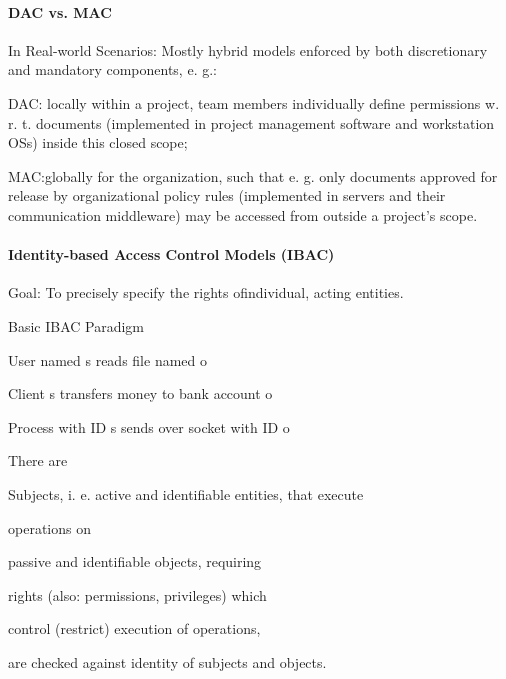 \documentclass[a4paper]{article}
\begin{document}
\begin{multicols}{3}
    \paragraph{DAC vs. MAC}
    In Real-world Scenarios: Mostly hybrid models enforced by both discretionary and mandatory components, e. g.:
    \begin{itemize*}
        \item DAC: locally within a project, team members individually define permissions w. r. t. documents (implemented in project management software and workstation OSs) inside this closed scope;
        \item MAC:globally for the organization, such that e. g. only documents approved for release by organizational policy rules (implemented in servers and their communication middleware) may be accessed from outside a project’s scope.
    \end{itemize*}


    \paragraph{Identity-based Access Control Models (IBAC)}
    Goal: To precisely specify the rights ofindividual, acting entities.

    Basic IBAC Paradigm %
    \begin{itemize*}
        \item User named s reads file named o
        \item Client s transfers money to bank account o
        \item Process with ID s sends over socket with ID o
    \end{itemize*}

    There are
    \begin{itemize*}
        \item Subjects, i. e. active and identifiable entities, that execute
        \item operations on
        \item passive and identifiable objects, requiring
        \item rights (also: permissions, privileges) which
              \begin{itemize*}
                  \item control (restrict) execution of operations,
                  \item are checked against identity of subjects and objects.
              \end{itemize*}
    \end{itemize*}


\end{multicols}
\end{document}
